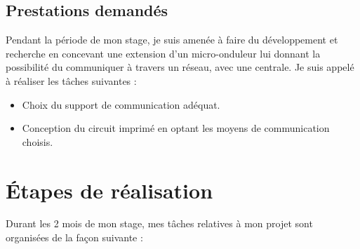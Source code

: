 \documentclass[11pt, a4paper, twoside]{book}
\begin{document}
\subsection{Prestations demandés}
Pendant la période de mon stage, je suis amenée à faire du développement et recherche en concevant une extension d’un micro-onduleur lui donnant la possibilité du communiquer à travers un réseau, avec une centrale. Je suis appelé à réaliser les tâches suivantes :
\begin{itemize}
\item Choix du support de communication adéquat.
\item Conception du circuit imprimé en optant les moyens de communication choisis.
\end{itemize}

\section{Étapes de réalisation}
Durant les 2 mois de mon stage, mes tâches relatives à mon projet sont organisées de la façon suivante :\\
\end{document}
